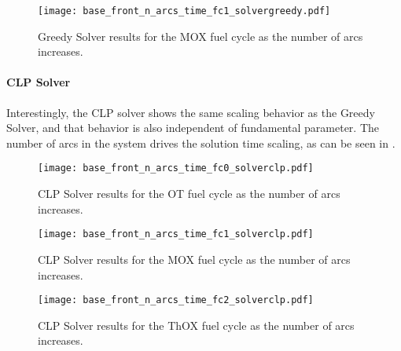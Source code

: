\begin{figure}[h!]
  \begin{center}
    \texttt{[image: base\_front\_n\_arcs\_time\_fc1\_solvergreedy.pdf]}
    \caption[]{
      \label{fig:base_front_n_arcs_time_fc1_solvergreedy}
      Greedy Solver results for the MOX fuel cycle as the number of arcs
      increases.      
    }
  \end{center}
\end{figure}

\paragraph{CLP Solver}

Interestingly, the CLP solver shows the same scaling behavior as the Greedy
Solver, and that behavior is also independent of fundamental parameter. The
number of arcs in the system drives the solution time scaling, as can be seen in
.

\begin{figure}[h!]
  \begin{center}
    \texttt{[image: base\_front\_n\_arcs\_time\_fc0\_solverclp.pdf]}
    \caption[]{
      \label{fig:base_front_n_arcs_time_fc0_solverclp}
      CLP Solver results for the OT fuel cycle as the number of arcs
      increases.
      }
  \end{center}
\end{figure}

\begin{figure}[h!]
  \begin{center}
    \texttt{[image: base\_front\_n\_arcs\_time\_fc1\_solverclp.pdf]}
    \caption[]{
      \label{fig:base_front_n_arcs_time_fc1_solverclp}
      CLP Solver results for the MOX fuel cycle as the number of arcs
      increases.
      }
  \end{center}
\end{figure}

\begin{figure}[h!]
  \begin{center}
    \texttt{[image: base\_front\_n\_arcs\_time\_fc2\_solverclp.pdf]}
    \caption[]{
      \label{fig:base_front_n_arcs_time_fc2_solverclp}
      CLP Solver results for the ThOX fuel cycle as the number of arcs
      increases.
      }
  \end{center}
\end{figure}

